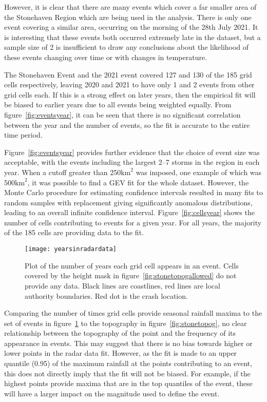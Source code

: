 However,
    it is clear that there are many events which cover a far smaller area of the Stonehaven Region which are being used in the analysis.
There is only one event covering a similar area,
    occurring on the morning of the 28th July 2021.
It is interesting that these events both occurred extremely late in the dataset,
    but a sample size of 2 is insufficient to draw any conclusions about the likelihood of these events changing over time or with changes in temperature.

The Stonehaven Event and the 2021 event covered 127 and 130 of the 185 grid cells respectively,
    leaving 2020 and 2021 to have only 1 and 2 events from other grid cells each.
If this is a strong effect on later years,
    then the empirical fit will be biased to earlier years due to all events being weighted equally.
From figure~\ref{fig:eventsyear}, it can be seen that there is no significant correlation between the
    year and the number of events, so the fit is accurate to the entire time period.

Figure~\ref{fig:eventsyear} provides further evidence that the choice of event size
    was acceptable,
    with the events including the largest 2--7 storms in the region in each year.
When a cutoff greater than 250$\text{km}^2$ was imposed,
    one example of which was 500$\text{km}^2$,
    it was possible to find a GEV fit for the whole dataset.
However,
    the Monte Carlo procedure for estimating confidence intervals resulted in many fits
    to random samples with replacement giving significantly anomalous distributions,
    leading to an overall infinite confidence interval.
Figure~\ref{fig:cellsyear} shows the number of cells contributing to events for a given year.
For all years, the majority of the 185 cells are providing data to the fit.

\begin{figure}[H]
    \centering
    \texttt{[image: yearsinradardata]}
    \caption[Plot of the number of years each grid cell appears in an event.]{
        Plot of the number of years each grid cell appears in an event.
    Cells covered by the height mask in figure~\ref{fig:stonetopogallowed}
        do not provide any data.
    Black lines are coastlines, red lines are local authority boundaries.
    Red dot is the crash location.}
    \label{fig:yearsinradardata}
\end{figure}

Comparing the number of times grid cells provide seasonal rainfall maxima to the set of events
    in figure~\ref{fig:yearsinradardata} to the topography in figure~\ref{fig:stonetopog},
    no clear relationship between the topography of the point and the frequency of its appearance in events.
This may suggest that there is no bias towards higher or lower points in the radar data fit.
However,
    as the fit is made to an upper quantile (0.95) of the maximum rainfall at the points contributing to an event,
    this does not directly imply that the fit will not be biased.
For example, if the highest points provide maxima that are in the top quantiles of the event,
    these will have a larger impact on the magnitude used to define the event.

